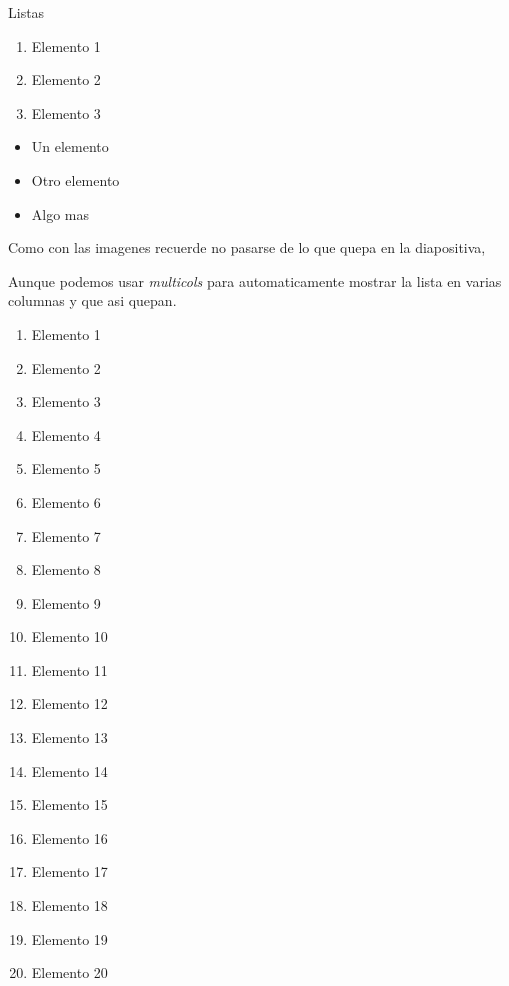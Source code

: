 \documentclass{beamer}
\begin{document}
\begin{frame}
	Listas
	
	\begin{enumerate}
		\item Elemento 1
		\item Elemento 2
		\item Elemento 3
	\end{enumerate}

	\begin{itemize}
		\item Un elemento
		\item Otro elemento
		\item Algo mas
	\end{itemize}

	Como con las imagenes recuerde no pasarse de lo que quepa en la diapositiva,
	
\end{frame}

\begin{frame}
	Aunque podemos usar \emph{multicols} para automaticamente mostrar la lista en varias columnas y que asi quepan.

	\begin{multicols}{3}
		\begin{enumerate}
			\item Elemento 1
			\item Elemento 2
			\item Elemento 3
			\item Elemento 4
			\item Elemento 5
			\item Elemento 6
			\item Elemento 7
			\item Elemento 8
			\item Elemento 9
			\item Elemento 10
			\item Elemento 11
			\item Elemento 12
			\item Elemento 13
			\item Elemento 14
			\item Elemento 15
			\item Elemento 16
			\item Elemento 17
			\item Elemento 18
			\item Elemento 19
			\item Elemento 20
		\end{enumerate}
	\end{multicols}


\end{frame}
\end{document}
